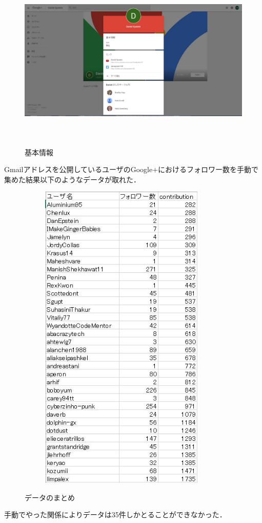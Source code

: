 \begin{figure}[htb]
\centering　
\includegraphics[height=8cm,width=13cm]{kihonn.JPG}
\caption{基本情報}
\end{figure}

\newpage

Gmailアドレスを公開しているユーザのGoogle+におけるフォロワー数を手動で集めた結果以下のようなデータが取れた．

\begin{figure}[htb]
\centering　
\includegraphics[height=15cm,width=9cm]{datata.JPG}
\caption{データのまとめ}
\end{figure}
手動でやった関係によりデータは35件しかとることができなかった．

